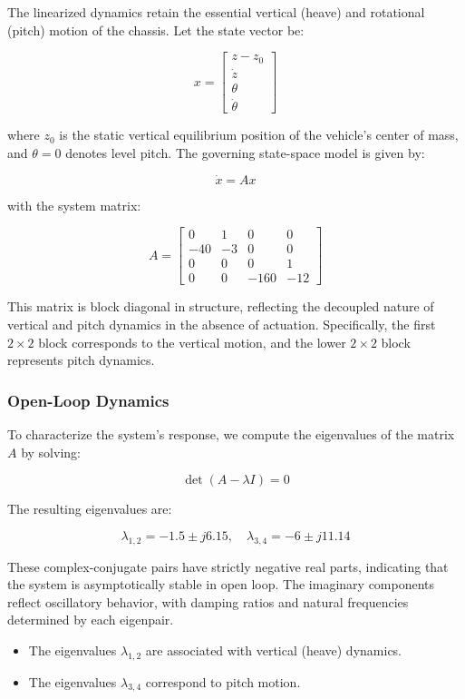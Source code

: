 \documentclass[]{report}
\begin{document}
The linearized dynamics retain the essential vertical (heave) and rotational (pitch) motion of the chassis. Let the state vector be:

\[
x = \begin{bmatrix}
	z - z_0 \\
	\dot{z} \\
	\theta \\
	\dot{\theta}
\end{bmatrix}
\]

where \( z_0 \) is the static vertical equilibrium position of the vehicle's center of mass, and \( \theta = 0 \) denotes level pitch. The governing state-space model is given by:

\[
\dot{x} = A x
\]

with the system matrix:

\[
A =
\begin{bmatrix}
	0 & 1 & 0 & 0 \\
	-40 & -3 & 0 & 0 \\
	0 & 0 & 0 & 1 \\
	0 & 0 & -160 & -12
\end{bmatrix}
\]

This matrix is block diagonal in structure, reflecting the decoupled nature of vertical and pitch dynamics in the absence of actuation. Specifically, the first \( 2 \times 2 \) block corresponds to the vertical motion, and the lower \( 2 \times 2 \) block represents pitch dynamics.

\subsubsection{Open-Loop Dynamics}

To characterize the system's response, we compute the eigenvalues of the matrix \( A \) by solving:

\[
\det(A - \lambda I) = 0
\]

The resulting eigenvalues are:

\[
\lambda_{1,2} = -1.5 \pm j6.15, \quad \lambda_{3,4} = -6 \pm j11.14
\]

These complex-conjugate pairs have strictly negative real parts, indicating that the system is asymptotically stable in open loop. The imaginary components reflect oscillatory behavior, with damping ratios and natural frequencies determined by each eigenpair.

\begin{itemize}
	\item The eigenvalues \( \lambda_{1,2} \) are associated with vertical (heave) dynamics.
	\item The eigenvalues \( \lambda_{3,4} \) correspond to pitch motion.
\end{itemize}
\end{document}
